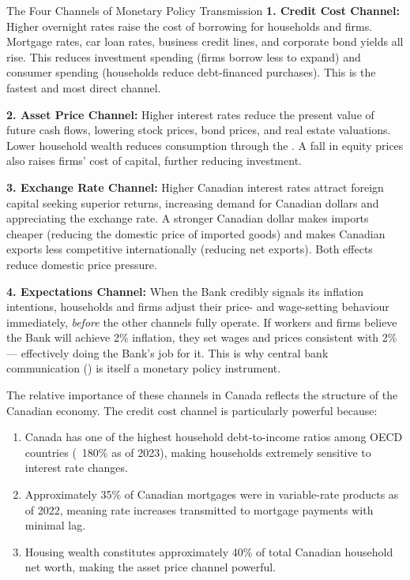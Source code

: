 \begin{defbox}{The Four Channels of Monetary Policy Transmission}
\textbf{1. Credit Cost Channel:} Higher overnight rates raise the cost
of borrowing for households and firms. Mortgage rates, car loan rates,
business credit lines, and corporate bond yields all rise. This reduces
investment spending (firms borrow less to expand) and consumer spending
(households reduce debt-financed purchases). This is the fastest and
most direct channel.

\textbf{2. Asset Price Channel:} Higher interest rates reduce the
present value of future cash flows, lowering stock prices, bond prices,
and real estate valuations. Lower household wealth reduces consumption
through the . A fall in equity prices also raises
firms' cost of capital, further reducing investment.

\textbf{3. Exchange Rate Channel:} Higher Canadian interest rates attract
foreign capital seeking superior returns, increasing demand for Canadian
dollars and appreciating the exchange rate. A stronger Canadian dollar
makes imports cheaper (reducing the domestic price of imported goods)
and makes Canadian exports less competitive internationally (reducing
net exports). Both effects reduce domestic price pressure.

\textbf{4. Expectations Channel:} When the Bank credibly signals
its inflation intentions, households and firms adjust their price- and
wage-setting behaviour immediately, \textit{before} the other channels
fully operate. If workers and firms believe the Bank will achieve 2\%
inflation, they set wages and prices consistent with 2\% --- effectively
doing the Bank's job for it. This is why central bank communication
() is itself a monetary policy instrument.
\end{defbox}

The relative importance of these channels in Canada reflects the
structure of the Canadian economy. The credit cost channel is particularly
powerful because:

\begin{enumerate}
  \item Canada has one of the highest household debt-to-income ratios
        among OECD countries (~180\% as of 2023), making households
        extremely sensitive to interest rate changes.
  \item Approximately 35\% of Canadian mortgages were in variable-rate
        products as of 2022, meaning rate increases transmitted to
        mortgage payments with minimal lag.
  \item Housing wealth constitutes approximately 40\% of total Canadian
        household net worth, making the asset price channel powerful.
\end{enumerate}

